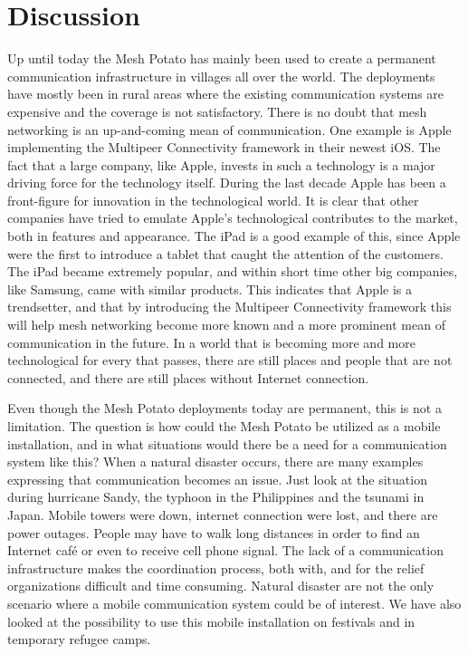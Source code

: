 \chapter{Discussion}
\label{chp:discussion} 

Up until today the Mesh Potato has mainly been used to create a permanent communication infrastructure in villages all over the world. The deployments have mostly been in rural areas where the existing communication systems are expensive and the coverage is not satisfactory. There is no doubt that mesh networking is an up-and-coming mean of communication. One example is Apple implementing the Multipeer Connectivity framework in their newest iOS. The fact that a large company, like Apple, invests in such a technology is a major driving force for the technology itself. During the last decade Apple has been a front-figure for innovation in the technological world. It is clear that other companies have tried to emulate Apple's technological contributes to the market, both in features and appearance. The iPad is a good example of this, since Apple were the first to introduce a tablet that caught the attention of the customers. The iPad became extremely popular, and within short time other big companies, like Samsung, came with similar products. This indicates that Apple is a trendsetter, and that by introducing the Multipeer Connectivity framework this will help mesh networking become more known and a more prominent mean of communication in the future. In a world that is becoming more and more technological for every that passes, there are still places and people that are not connected, and there are still places without Internet connection. 

Even though the Mesh Potato deployments today are permanent, this is not a limitation. The question is how could the Mesh Potato be utilized as a mobile installation, and in what situations would there be a need for a communication system like this? When a natural disaster occurs, there are many examples expressing that communication becomes an issue. Just look at the situation during hurricane Sandy, the typhoon in the Philippines and the tsunami in Japan. Mobile towers were down, internet connection were lost, and there are power outages. People may have to walk long distances in order to find an Internet café or even to receive cell phone signal. The lack of a communication infrastructure makes the coordination process, both with, and for the relief organizations difficult and time consuming. Natural disaster are not the only scenario where a mobile communication system could be of interest. We have also looked at the possibility to use this mobile installation on festivals and in temporary refugee camps. 

